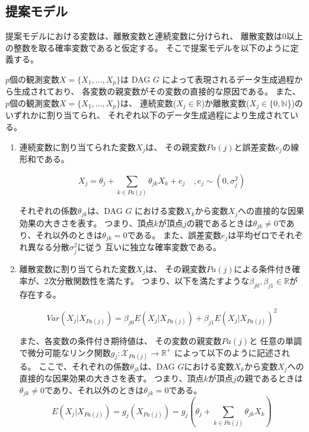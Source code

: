 
\subsection{提案モデル}

提案モデルにおける変数は、離散変数と連続変数に分けられ、
離散変数は0以上の整数を取る確率変数であると仮定する。
そこで提案モデルを以下のように定義する。

\begin{df}[提案モデル] \label{prop_model}
  $p$個の観測変数$X = \{ X_1, \dots, X_p \}$は
  DAG $G$ によって表現されるデータ生成過程から生成されており、
  各変数の親変数がその変数の直接的な原因である。
  また、$p$個の観測変数$X = \{ X_1, \dots, X_p \}$は、
  連続変数($X_j \in \mathbb R$)か離散変数($X_j \in \{0, \mathbb N$\})の
  いずれかに割り当てられ、
  それぞれ以下のデータ生成過程により生成されている。

  \begin{enumerate}
    \setlength{\itemsep}{0.3cm}
    \item
    連続変数に割り当てられた変数$X_j$は、
    その親変数$Pa(j)$と誤差変数$e_j$の線形和である。

    \begin{equation}
      X_j = \theta_{j} + \sum_{k \in Pa(j)} \theta_{jk}X_k + e_j
      \quad , e_j \sim (0, \sigma_j^2)
      \label{eq:anm_prop}
    \end{equation}

    それぞれの係数$\theta_{jk}$は、DAG $G$ における変数$X_k$から変数$X_j$への直接的な因果効果の大きさを表す。
    つまり、頂点$k$が頂点$j$の親であるときは$\theta_{jk} \neq 0$であり、それ以外のときは$\theta_{jk} = 0$である。
    また、誤差変数$e_j$は平均ゼロでそれぞれ異なる分散$\sigma_j^2$に従う
    互いに独立な確率変数である。

    \item
    離散変数に割り当てられた変数$X_j$は、
    その親変数$Pa(j)$による条件付き確率が、2次分散関数性を満たす。
    つまり、以下を満たすような$\beta_{j0},\beta_{j1} \in \mathbb{R}$が存在する。

    \begin{equation}
      \mathit{Var}(X_j|X_{Pa(j)}) = \beta_{j0} E(X_j | X_{Pa(j)}) + \beta_{j1} E(X_j | X_{Pa(j)})^2
      \label{QVF_prop}
    \end{equation}

    また、各変数の条件付き期待値は、
    その変数の親変数$Pa(j)$と
    任意の単調で微分可能なリンク関数$g_j \colon \mathcal X_{Pa(j)} \rightarrow \mathbb R^+$
    によって以下のように記述される。
    ここで、それぞれの係数$\theta_{jk}$は、DAG $G$における変数$X_k$から変数$X_j$への直接的な因果効果の大きさを表す。
    つまり、頂点$k$が頂点$j$の親であるときは$\theta_{jk} \neq 0$であり、それ以外のときは$\theta_{jk} = 0$である。
    \begin{equation}
      E(X_j | X_{Pa(j)})
      = g_j(X_{Pa(j)})
      = g_j \left(\theta_j + \sum_{k \in Pa(j)} \theta_{jk}X_k \right)
    \end{equation}

  \end{enumerate}
\end{df}

